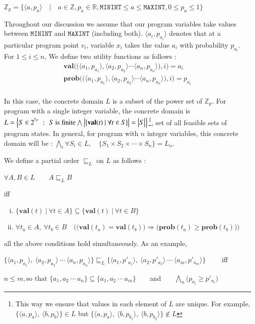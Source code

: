 \documentclass[final,3p, review, times]{Elsevier/elsarticle}
\begin{document}
\centerline{
  $\mathbb{Z}_p=\Big\{\langle a,p_a\rangle\quad\big|\quad a\in\mathbb{Z}, p_a\in\mathbb{R}, \mathtt{MININT}\leq a\leq\mathtt{MAXINT}, 0\leq p_a\leq1\Big\}$
}

Throughout our discussion we assume that our program variables take values between $\mathbf{\mathtt{MININT}}$ and $\mathbf{\mathtt{MAXINT}}$ (including both). $\langle a_i,p_{a_i}\rangle$ denotes that at a particular program point $v_i$, variable $x_i$ takes the value $a_i$ with probability $p_{a_i}$. For $1\leq i\leq n$, We define two utility functions as follows :
\begin{align}
  \mathbf{val}\bigg(\Big(\langle a_1,p_{a_1}\rangle,\langle a_2,p_{a_2}\rangle\cdots\langle a_n,p_{a_n}\rangle\Big),i\bigg)=a_i\label{eq:val}\\
  \mathbf{prob}\bigg(\Big(\langle a_1,p_{a_1}\rangle,\langle a_2,p_{a_2}\rangle\cdots\langle a_n,p_{a_n}\rangle\Big),i\bigg)=p_{a_i}\label{eq:prob}\\
\end{align}

In this case, the concrete domain $L$ is a subset of the power set of $\mathbb{Z}_p$. For program with a single integer variable, the concrete domain is $L=\Big\{S\in2^{^{\mathbb{Z}_p}}\ \Large:\ \normalsize S\ \text{is finite}\bigwedge\big|\big\{\mathbf{val}(t)\ |\ \forall t\in S\big\}\big|=\big|S\big|\Big\}$\footnote{This way we ensure that values in each element of $L$ are unique. For example, $\Big\{\langle a,p_a\rangle,\ \langle b,p_b\rangle\Big\}\in L$ but $\Big\{\langle a,p_a\rangle,\ \langle b,p_{b_1}\rangle,\ \langle b,p_{b_2}\rangle\Big\}\notin L$}, set of all feasible sets of program states. In general, for program with $n$ integer variables, this concrete domain will be : $\displaystyle\bigwedge_i \forall S_i\in L,\quad\Big\{S_1\times S_2\times\cdots\times S_n\Big\}=L_n.$

We define a partial order $\sqsubseteq_L$ on $L$ as follows :

\centerline{$\forall A,B\in L\qquad A\sqsubseteq_L B$}
iff
\begin{enumerate}[i)]
\item $\Big\{\mathbf{val}(t)\ \big|\ \forall t\in A\Big\}\subseteq\Big\{\mathbf{val}(t)\ \big|\ \forall t\in B\Big\}$
\item $\forall t_a\in A,\ \forall t_b\in B\quad\bigg(\Big(\mathbf{val}(t_a)=\mathbf{val}(t_b)\Big)\Rightarrow\Big(\mathbf{prob}(t_a)\geq\mathbf{prob}(t_b)\Big)\bigg)$
\end{enumerate}
all the above conditions hold simultaneously. As an example,\\
\centerline{
  $\Big\{\langle a_1,p_{a_1}\rangle,\ \langle a_2,p_{a_2}\rangle\ \cdots\ \langle a_n,p_{a_n}\rangle\Big\}\sqsubseteq_L\Big\{\langle a_1,p'_{a_1}\rangle,\ \langle a_2,p'_{a_2}\rangle\ \cdots\ \langle a_m,p'_{a_m}\rangle\Big\}\qquad$ iff
}
\centerline{
  $n\leq m, \text{so that\ }\big\{a_1,a_2\ \cdots\ a_n\big\}\subseteq\big\{a_1,a_2\ \cdots\ a_m\big\}\qquad$and$\qquad\displaystyle\bigwedge_n \big(p_{a_i}\geq p'_{a_i}\big)$
}
\end{document}
